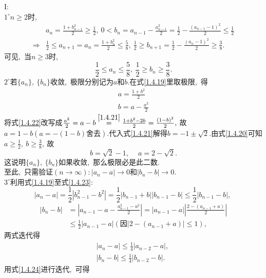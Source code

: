 \begin{solution}
	I:\\
	$1^\circ n\geqslant 2$时,\ 
	$$\begin{aligned}
		&a_n=\frac{1+b_{n-1}^2}{2}\geqslant\frac{1}{2},\ 0<b_n=a_{n-1}-\frac{a_{n-1}^2}{2}=\frac{1}{2}-\frac{(a_{n-1}-1)^2}{2}\leqslant\frac{1}{2}\\
		\Rightarrow&\frac{1}{2}\leqslant a_{n+1}=a_n=\frac{1+b_{n}^2}{2}\leqslant\frac{5}{8},\ \frac{1}{2}\geqslant b_{n+1}=\frac{1}{2}-\frac{(a_{n}-1)^2}{2}\geqslant\frac{3}{8}.
	\end{aligned}$$
	可见,\ 当$n\geqslant 3$时,\ 
	\begin{equation}
		\frac{1}{2}\leqslant a_n\leqslant \frac{5}{8},\ \frac{1}{2}\geqslant b_n\geqslant \frac{3}{8}.\label{1.4.20}
	\end{equation}
	$2^\circ$若$\{a_n\},\ \{b_n\}$收敛,\ 极限分别记为$a$和$b.$在式\eqref{1.4.19}里取极限,\ 得
	\begin{align}
		a=\frac{1+b^2}{2}\label{1.4.21}\\
		b=a-\frac{a^2}{2}\label{1.4.22}
	\end{align}
	将式\eqref{1.4.22}改写成$\frac{a^2}{2}=a-b\stackrel{\eqref{1.4.21}}{=}\frac{1+b^2-2b}{2}=\frac{(1-b)^2}{2},\ $故$a=1-b(a=-(1-b)\text{舍去}).$代入式\eqref{1.4.21}解得$b=-1\pm\sqrt{2}.$由式\eqref{1.4.20}可知$a\geqslant \frac{1}{2},\ b\geqslant\frac{3}{8},\ $故
	\begin{equation}
		b=\sqrt{2}-1,\ \quad a=2-\sqrt{2}.\label{1.4.23}
	\end{equation}
	这说明$\{a_n\},\ \{b_n\}$如果收敛,\ 那么极限必是此二数.\\
	至此,\ 只需验证$(n\rightarrow\infty):|a_n-a|\rightarrow 0$和$|b_n-b|\rightarrow 0.$\\
	$3^\circ$利用式\eqref{1.4.19}至式\eqref{1.4.23}:
	$$|a_n-a|=\frac{1}{2}|b_{n-1}^2-b^2|=\frac{1}{2}|b_{n-1}+b||b_{n-1}-b|\leqslant\frac{1}{2}|b_{n-1}-b|,\ $$
	$$\begin{aligned}
		|b_n-b|&=\left|a_{n-1}-a-\frac{a_{n-1}^2-a^2}{2}\right|=|a_{n-1}-a|\left|\frac{2-(a_{n-1}+a)}{2}\right|\\
		&\leqslant\frac{1}{2}|a_{n-1}-a|(\text{因}|2-(a_{n-1}+a)|\leqslant 1),\ 
	\end{aligned}$$
	两式迭代得
	\begin{align}
		|a_n-a|\leqslant\frac{1}{4}|a_{n-2}-a|,\ \label{1.4.24}\\
		|b_n-b|\leqslant\frac{1}{4}|b_{n-2}-b|.\label{1.4.25}
	\end{align}
	用式\eqref{1.4.24}进行迭代,\ 可得

\end{solution}
